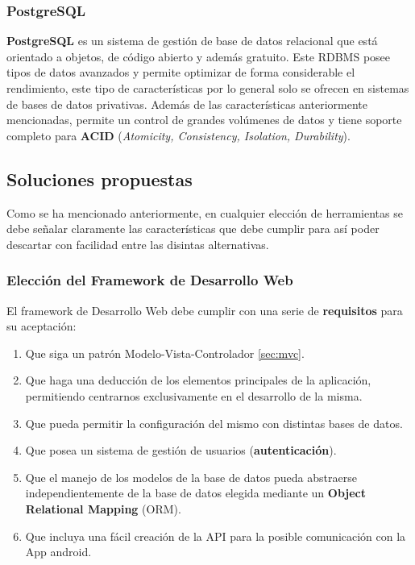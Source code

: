     \subsubsection{PostgreSQL}
    \textbf{PostgreSQL} \cite{postgresql} es un sistema de gestión de base de datos relacional
    que está orientado a objetos, de código abierto y además gratuito. Este RDBMS posee tipos
    de datos avanzados y permite optimizar de forma considerable el rendimiento, este tipo de
    características por lo general solo se ofrecen en sistemas de bases de datos privativas.
    Además de las características anteriormente mencionadas, permite un control de grandes
    volúmenes de datos y tiene soporte completo para \textbf{ACID} (\textit{Atomicity,
    Consistency, Isolation, Durability}).

\subsection{Soluciones propuestas}
Como se ha mencionado anteriormente, en cualquier elección de herramientas se debe señalar
claramente las características que debe cumplir para así poder descartar con facilidad
entre las disintas alternativas.

    \subsubsection{Elección del Framework de Desarrollo Web}
    El framework de Desarrollo Web debe cumplir con una serie de \textbf{requisitos} para
    su aceptación:

        \begin{enumerate}
            \item Que siga un patrón Modelo-Vista-Controlador \ref{sec:mvc}.
            \item Que haga una deducción de los elementos principales de la aplicación,
            permitiendo centrarnos exclusivamente en el desarrollo de la misma.
            \item Que pueda permitir la configuración del mismo con distintas bases de
            datos.
            \item Que posea un sistema de gestión de usuarios (\textbf{autenticación}).
            \item Que el manejo de los modelos de la base de datos pueda abstraerse
            independientemente de la base de datos elegida mediante un \textbf{Object
            Relational Mapping} (ORM).
            \item Que incluya una fácil creación de la API para la posible comunicación
            con la App android.
        \end{enumerate}

